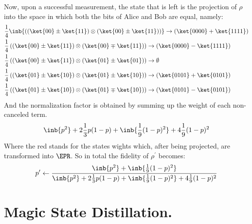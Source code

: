 \documentclass[12pt,a4paper]{article}
\begin{document}
Now, upon a successful measurement, the state that is left is the projection of $\rho$ into the space in which both the bits of Alice and Bob are equal, namely:
\begin{equation*}
  \begin{split}
    & \frac{1}{4} \inb{ \left(  \left(\ket{00} \pm \ket{11} \right) \otimes \left(\ket{00} \pm \ket{11} \right) \right) }  \rightarrow \left( \ket{0000} + \ket{1111} \right)  \\ 
    & \frac{1}{4}  \left(  \left(\ket{00} \pm \ket{11} \right) \otimes \left(\ket{00} \mp \ket{11} \right) \right)  \rightarrow \left( \ket{0000} - \ket{1111} \right)  \\ 
    & \frac{1}{4}  \left(  \left(\ket{00} \pm \ket{11} \right) \otimes \left(\ket{01} \pm \ket{01} \right) \right)  \rightarrow \emptyset  \\ 
    & \frac{1}{4}  \left(  \left(\ket{01} \pm \ket{10} \right) \otimes \left(\ket{01} \pm \ket{10} \right) \right)  \rightarrow \left( \ket{0101} + \ket{0101} \right)  \\ 
    & \frac{1}{4}  \left(  \left(\ket{01} \pm \ket{10} \right) \otimes \left(\ket{01} \mp \ket{10} \right) \right)  \rightarrow \left( \ket{0101} - \ket{0101} \right)  
  \end{split}
\end{equation*}
And the normalization factor is obtained by summing up the weight of each non-canceled term. 
\begin{equation*}
  \begin{split}
    \inb{p^2} + 2\frac{1}{3} p(1-p)+ \inb{\frac{1}{9}(1-p)^2} + 4\frac{1}{9}(1-p)^2 
  \end{split}
\end{equation*}
Where the red stands for the states wights which, after being projected, are transformed into $\EPR$. So in total the fidelity of $\rho^{\prime}$ becomes:
\begin{equation*}
  \begin{split}
    p^\prime \leftarrow \frac{ \inb{p^2} + \inb{\frac{1}{9}(1-p)^2} }{ \inb{p^2} + 2\frac{1}{3} p(1-p)+\inb{ \frac{1}{9}(1-p)^2} + 4\frac{1}{9}(1-p)^2  }
  \end{split}
\end{equation*}





\ifdefined\DEBUG
\section{Magic State Distillation.}
\end{document}
